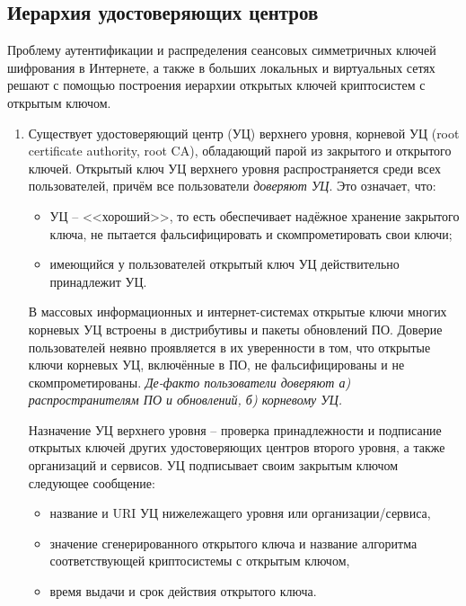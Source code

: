 \subsection{Иерархия удостоверяющих центров}\label{section-CAs}

Проблему аутентификации и распределения сеансовых симметричных ключей шифрования в Интернете, а также в больших локальных и виртуальных сетях решают с помощью построения иерархии открытых ключей криптосистем с открытым ключом.

\begin{enumerate}
    \item Существует удостоверяющий центр (УЦ) верхнего уровня, корневой УЦ (root certificate authority, root CA), обладающий парой из закрытого и открытого ключей. Открытый ключ УЦ верхнего уровня распространяется среди всех пользователей, причём все пользователи \emph{доверяют УЦ}. Это означает, что:
        \begin{itemize}
            \item УЦ -- <<хороший>>, то есть обеспечивает надёжное хранение закрытого ключа, не пытается фальсифицировать и скомпрометировать свои ключи;
            \item имеющийся у пользователей открытый ключ УЦ действительно принадлежит УЦ.
        \end{itemize}
        В массовых информационных и интернет-системах открытые ключи многих корневых УЦ встроены в дистрибутивы и пакеты обновлений ПО. Доверие пользователей неявно проявляется в их уверенности в том, что открытые ключи корневых УЦ, включённые в ПО, не фальсифицированы и не скомпрометированы. \emph{Де-факто пользователи доверяют а) распространителям ПО и обновлений, б) корневому УЦ.}

        Назначение УЦ верхнего уровня -- проверка принадлежности и подписание открытых ключей других удостоверяющих центров второго уровня, а также организаций и сервисов. УЦ подписывает своим закрытым ключом следующее сообщение:
        \begin{itemize}
            \item название и URI УЦ нижележащего уровня или организации/сервиса,
            \item значение сгенерированного открытого ключа и название алгоритма соответствующей криптосистемы с открытым ключом,
            \item время выдачи и срок действия открытого ключа.
        \end{itemize}


\end{enumerate}

